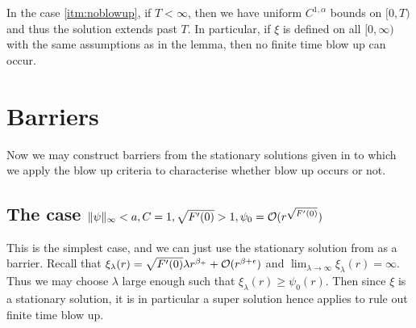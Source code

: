\documentclass{amsart}
\begin{document}
\begin{rem}
In the case \ref{itm:noblowup}, if \(T < \infty\), then we have uniform \(C^{1,\alpha}\) bounds on \([0, T)\) and thus the solution extends past \(T\). In particular, if \(\xi\) is defined on all \([0, \infty)\) with the same assumptions as in the lemma, then no finite time blow up can occur.
\end{rem}

\section{Barriers}
\label{subsec:barriers}

Now we may construct barriers from the stationary solutions given in  to which we apply the blow up criteria  to characterise whether blow up occurs or not.

\subsection{The case \(\|\psi\|_{\infty} < a, C=1, \sqrt{F'(0)} > 1, \psi_0 = \operatorname{\mathcal{O}}(r^{\sqrt{F'(0)}})\)}

This is the simplest case, and we can just use the stationary solution from  as a barrier. Recall that \(\xi_{\lambda} (r) = \sqrt{F'(0)} \lambda r^{\beta_+} + \operatorname{\mathcal{O}}(r^{\beta + \epsilon})\) and \(\lim_{\lambda \to \infty} \xi_{\lambda} (r) = \infty\). Thus we may choose \(\lambda\) large enough such that \(\xi_{\lambda}(r) \geq \psi_0(r)\). Then since \(\xi\) is a stationary solution, it is in particular a super solution hence  applies to rule out finite time blow up. 
\end{document}
